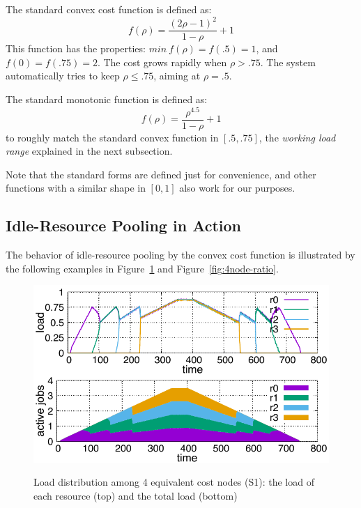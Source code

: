 The standard convex cost function is defined as:
\begin{equation*}
	f(\rho) = \frac{(2\rho - 1)^{2}}{1 - \rho} + 1
\end{equation*}
This function has the properties:
$min\: f(\rho) = f(.5) = 1$, and $f(0) = f(.75) = 2$.
The cost grows rapidly when $\rho > .75$.
The system automatically tries to keep $\rho \le .75$,
aiming at $\rho = .5$.

The standard monotonic function is defined as:
\begin{equation*}
	f(\rho) = \frac{\rho^{4.5}}{1 - \rho} + 1
\end{equation*}
to roughly match the standard convex function in $[.5, .75]$,
the {\em working load range} explained in the next subsection.

Note that the standard forms are defined just for convenience, and
other functions with a similar shape in $[0,1]$ also work for our
purposes.

\subsection{Idle-Resource Pooling in Action}

The behavior of idle-resource pooling by the convex cost function is
illustrated by the following examples in Figure~\ref{fig:4node} and
Figure~\ref{fig:4node-ratio}.

\begin{figure}[tb]
  \begin{center}
    \includegraphics[width=1.0\columnwidth]{4node.pdf}
    \vspace{-2.0ex}
    \caption{Load distribution among 4 equivalent cost nodes (S1):
    the load of each resource (top) and the total load (bottom)}
    \label{fig:4node}
  \end{center}
  \hspace{0.8\columnsep}
\end{figure}

